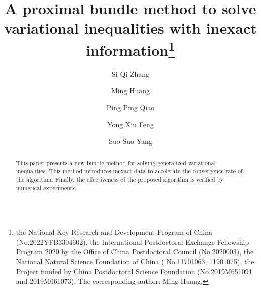 \documentclass[12pt]{llncs}
\begin{document}
\fi
%
\title{A proximal bundle method to solve variational inequalities with inexact information\thanks{the National Key Research and Development Program of China (No.2022YFB3304602), the International Postdoctoral Exchange Fellowship Program 2020 by the Office of China Postdoctoral Council (No.2020003), the National Natural Science Foundation of China ( No.11701063, 11901075),
the Project funded by China Postdoctoral Science Foundation  (No.2019M651091 and 2019M661073). The corresponding author: Ming Huang.}}
\author{Si Qi Zhang \and Ming Huang \and Ping Ping Qiao \and Yong Xiu Feng \and Suo Suo Yang
  }
\maketitle
\begin{abstract}
This paper presents a new bundle method for solving generalized variational inequalities. This method introduces inexact data to accelerate the convergence rate of the algorithm. Finally, the effectiveness of the proposed algorithm is verified by numerical experiments.
\end{abstract}
\end{document}
